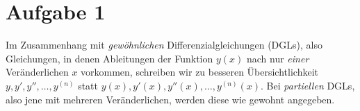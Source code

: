 \documentclass[main.tex]{subfiles}
\begin{document}
\section{Aufgabe 1}
Im Zusammenhang mit \textit{gewöhnlichen} Differenzialgleichungen (DGLs), also Gleichungen, in denen Ableitungen der Funktion $y(x)$ nach nur \textit{einer} Veränderlichen $x$ vorkommen, schreiben wir zu besseren Übersichtlichkeit $y, y', y'', \ldots, y^{(n)}$ statt $y(x), y'(x), y''(x), \ldots, y^{(n)}(x)$. 
Bei \textit{partiellen} DGLs, also jene mit mehreren Veränderlichen, werden diese wie gewohnt angegeben.
\end{document}
